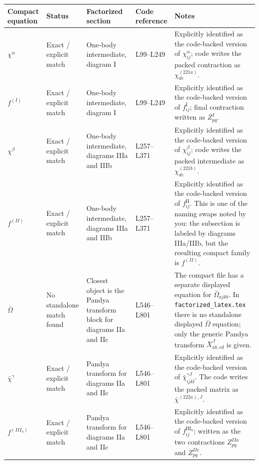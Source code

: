 \documentclass{article}
\begin{document}
\renewcommand{\arraystretch}{1.2}
\begin{longtable}{p{} p{} p{} p{} p{}}
\toprule
Compact equation & Status & Factorized section & Code reference & Notes \\
\midrule
\endhead

$\chi^{\alpha}$ & Exact / explicit match & One-body intermediate, diagram I & L99--L249 & Explicitly identified as the code-backed version of $\chi^{\alpha}_{ij}$; code writes the packed contraction as $\chi^{(221a)}_{de}$. \\

$f^{(I)}$ & Exact / explicit match & One-body intermediate, diagram I & L99--L249 & Explicitly identified as the code-backed version of $f^{\mathrm{I}}_{ij}$; final contraction written as $Z^I_{pq}$. \\

$\chi^{\beta}$ & Exact / explicit match & One-body intermediate, diagrams IIIa and IIIb & L257--L371 & Explicitly identified as the code-backed version of $\chi^{\beta}_{ij}$; code writes the packed intermediate as $\chi^{(221b)}_{de}$. \\

$f^{(II)}$ & Exact / explicit match & One-body intermediate, diagrams IIIa and IIIb & L257--L371 & Explicitly identified as the code-backed version of $f^{\mathrm{II}}_{ij}$. This is one of the naming swaps noted by you: the subsection is labeled by diagrams IIIa/IIIb, but the resulting compact family is $f^{(II)}$. \\

$\bar\Omega$ & No standalone match found & Closest object is the Pandya transform block for diagrams IIa and IIc & L546--L801 & The compact file has a separate displayed equation for $\bar\Omega_{ajkb}$. In \texttt{factorized\_latex.tex} there is no standalone displayed $\bar\Omega$ equation; only the generic Pandya transform $\bar X^J_{ab,cd}$ is given. \\

$\bar\chi^{\gamma}$ & Exact / explicit match & Pandya transform for diagrams IIa and IIc & L546--L801 & Explicitly identified as the code-backed version of $\bar\chi^{\gamma J}_{i\bar j k\bar l}$. The code writes the packed matrix as $\bar\chi^{(222a),J}$. \\

$f^{(III_a)}$ & Exact / explicit match & Pandya transform for diagrams IIa and IIc & L546--L801 & Explicitly identified as the code-backed version of $f^{\mathrm{III}_a}_{ij}$; written as the two contractions $Z^{IIa}_{pq}$ and $Z^{IIc}_{pq}$. \\


\end{longtable}
\end{document}
